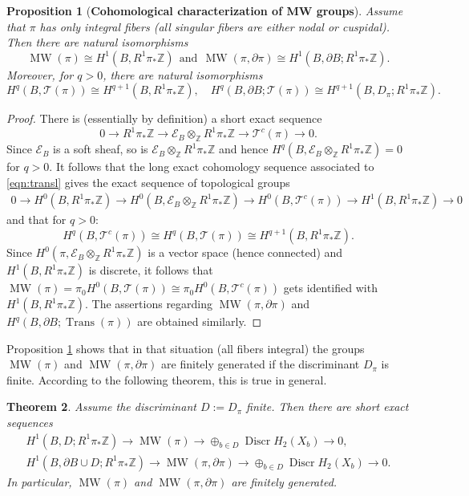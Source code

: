 \documentclass[10pt,letterpaper]{amsart}
\numberwithin{equation}{section}
\def\ZZ{{\mathbb Z}}
\newcommand{\p}{\partial}
\def\Escr{{\mathscr E}}
\def\Tscr{{\mathscr T}}
\newcommand\discr{\operatorname{Discr}}
\newcommand\MW{\operatorname{MW}}
\newcommand\Trans{\operatorname{Trans}}
\newtheorem{theorem}{Theorem}[section]
\newtheorem{proposition}[theorem]{Proposition}
\theoremstyle{remark}
\begin{document}
\begin{proposition}[{\bf Cohomological characterization of MW groups}]
\label{prop:MWcohomology}
 Assume that $\pi$  has only integral fibers  (all singular  fibers are either nodal or cuspidal). Then there are natural isomorphisms 
 \[
 \MW(\pi)\cong H^1(B, R^1\pi_*\ZZ) \ \ \text{and}\ \  \MW(\pi, \p\pi) \cong H^1(B, \p B; R^1\pi_*\ZZ).
 \]
 Moreover,  for $q>0$, there are natural isomorphisms 
\[
H^q(B, \Tscr(\pi))\cong  H^{q+1}(B,R^1\pi_*\ZZ), \quad 
H^q(B,\p B;\Tscr(\pi))\cong  H^{q+1}(B,D_\pi;R^1\pi_*\ZZ).
\]
\end{proposition}


\begin{proof}
There is (essentially by definition) a  short exact sequence 
\begin{equation}\label{eqn:transl}
0\to R^1\pi_{*}\ZZ\to \Escr_B\otimes_\ZZ R^1\pi_{*}\ZZ \to \Tscr^c(\pi)\to  0.
\end{equation}
Since $\Escr_B$ is a soft sheaf, so is $\Escr_B\otimes_\ZZ R^1\pi_*\ZZ $ and hence $H^q(B, \Escr_B\otimes_\ZZ R^1\pi_*\ZZ)=0$ for $q>0$. It follows that the long exact cohomology sequence associated to \eqref{eqn:transl} gives the exact sequence of topological groups
\begin{multline*}
0\to H^0(B,R^1\pi_*\ZZ)\to H^0(B, \Escr_B\otimes_\ZZ R^1\pi_*\ZZ)  \to  H^0(B,\Tscr^c(\pi))\to H^1(B,R^1\pi_*\ZZ)\to 0
\end{multline*}
and that for $q>0$:  
\[ H^q(B, \Tscr^c(\pi))\cong H^q(B, \Tscr(\pi))\cong  H^{q+1}(B,R^1\pi_*\ZZ).\]
Since $H^0(\pi, \Escr_B\otimes_\ZZ R^1\pi_*\ZZ)$ is a vector space (hence connected)
and $H^1(B,R^1\pi_*\ZZ)$ is discrete, it follows that 
$\MW(\pi)=\pi_0H^0(B, \Tscr(\pi))\cong \pi_0H^0(B,\Tscr^c(\pi))$ gets identified with $H^1(B,R^1\pi_*\ZZ)$.  The assertions regarding  $\MW(\pi, \p\pi)$ and
$H^q(B, \p B;\Trans(\pi))$ are obtained similarly.
\end{proof}

Proposition \ref{prop:MWcohomology} shows that in that situation (all fibers integral)  the groups  $\MW(\pi)$ and $\MW(\pi, \p\pi)$ are finitely generated if the discriminant $D_\pi$ is  finite.  According to the following theorem, this is true in general.


\begin{theorem}\label{thm:finitegen}
Assume the discriminant $D:=D_\pi$ finite. Then there are short exact sequences 
\begin{gather*}
H^1(B, D; R^1\pi_*\ZZ)\to  \MW(\pi)\to \oplus_{b\in D} \discr H_2(X_b)\to 0,\\
H^1(B, \p B\cup D;R^1\pi_*\ZZ)\to  \MW(\pi, \p\pi)\to \oplus_{b\in D} \discr H_2(X_b)\to 0.
\end{gather*}
In particular, $\MW(\pi)$ and $\MW(\pi, \p\pi)$ are finitely generated.
\end{theorem}
\end{document}
